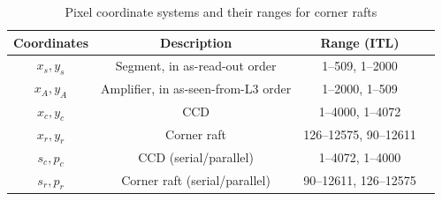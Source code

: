 \documentclass{article}[12pt]
\begin{document}
{\begin{table}
\begin{centering}
\begin{tabular}{| c | c | c | c |}
\hline
{\bf Coordinates} & {\bf Description} & {\bf Range (ITL)}  \\
\hline
$x_s, y_s$ & Segment, in as-read-out order &  1--509, 1--2000  \\
$x_A, y_A$ & Amplifier, in as-seen-from-L3 order & 1--2000, 1--509 \\
$x_c, y_c$ & CCD &  1--4000, 1--4072  \\
$x_r, y_r$ & Corner raft &  126--12575, 90--12611 \\
$s_c, p_c$ & CCD (serial/parallel) & 1--4072, 1--4000 \\
$s_r, p_r$ & Corner raft (serial/parallel) & 90--12611, 126--12575 \\
\hline
\end{tabular}
\caption{Pixel coordinate systems and their ranges for corner rafts \label{tab:cr_coords}}
\end{centering}
\end{table}


}
\end{document}
